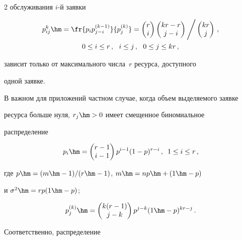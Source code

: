 \begin{multicols}{2}
обслуживания $i$-й заявки 

\begin{multline*}

p_{ij}^k\hm= \fr{p_i p_{j-i}^{(k-1)}}{p_j^{(k)}} = 

\begin{pmatrix}r\\i\end{pmatrix}\begin{pmatrix} kr-r\\ j-i\end{pmatrix}\Bigg/ 

\begin{pmatrix} kr\\ j\end{pmatrix}\,,\\ 0\leq i\leq r\,,\ \ i\leq j\,,\ \ 0\leq 

j\leq kr\,,

\end{multline*}

 зависит только от максимального числа~$r$ ресурса, доступного 

одной заявке.

  

  В важном для приложений частном случае, когда объем выделяемого заявке 

ресурса больше нуля, $r_j\hm>0$ имеет смещенное биномиальное 

распределение 

$$

p_i\hm= \begin{pmatrix} r-1\\ i-1\end{pmatrix} p^{i-1}(1-p)^{r-i}\,,\enskip 

1\leq i\leq r\,,

$$

где $p\hm=(m\hm-1)/(r\hm-1)$, $m\hm= np\hm+ (1\hm-p)$ 

и $\sigma^2\hm= rp(1\hm-p)$;

$$

p_j^{(k)}\hm= \begin{pmatrix} k(r-1)\\ j-

k\end{pmatrix} p^{j-k} (1\hm-p)^{kr-j}\,.

$$



 Соответственно, распределение 

  \begin{multline*}


\end{multline*}
\end{multicols}
